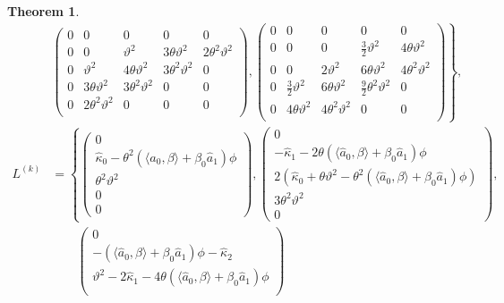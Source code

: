 \documentclass[pdftex,11pt,a4paper] {article}
\newtheorem{theorem}{Theorem}[section]
\begin{document}
\begin{theorem}
\begin{equation*}
\begin{split}
&
\left.
\begin{pmatrix} %
0 & 0 & 0 & 0 & 0 \\
0 & 0 & \vartheta^2 & 3\theta\vartheta^2 & 2\theta^2\vartheta^2 \\
0 & \vartheta^2 & 4\theta\vartheta^2 & 3\theta^2\vartheta^2 & 0 \\
0 & 3\theta\vartheta^2 & 3\theta^2\vartheta^2 & 0 & 0 \\
0 & 2\theta^2\vartheta^2 & 0 & 0 & 0\\
\end{pmatrix},
\begin{pmatrix} %
0 & 0 & 0 & 0 & 0 \\
0 & 0 & 0 & \frac{3}{2}\vartheta^2 & 4\theta\vartheta^2 \\
0 & 0 & 2\vartheta^2 & 6\theta\vartheta^2 & 4\theta^2\vartheta^2 \\
0 & \frac{3}{2}\vartheta^2 & 6\theta\vartheta^2 & \frac{9}{2}\theta^2\vartheta^2 & 0 \\
0 & 4\theta\vartheta^2 & 4\theta^2\vartheta^2 & 0 & 0\\
\end{pmatrix}\right\},\\
L^{(k)}&=\left\{\begin{pmatrix} %
0 \\ \hat\kappa_0-\theta^2(\langle \hat a_0, \beta\rangle+\beta_0 \hat a_1) \phi \\ \theta^2\vartheta^2 \\ 0 \\ 0
\end{pmatrix},
\begin{pmatrix} %
0 \\ -\hat\kappa_1-2\theta(\langle \hat a_0, \beta\rangle+\beta_0 \hat a_1) \phi \\ 2(\hat\kappa_0+\theta\vartheta^2-\theta^2(\langle \hat a_0, \beta\rangle+\beta_0 \hat a_1) \phi)\\ 3\theta^2\vartheta^2 \\ 0
\end{pmatrix},\right. \\
&\left.\qquad
\begin{pmatrix} %
0 \\  -(\langle \hat a_0, \beta\rangle+\beta_0 \hat a_1) \phi-\hat\kappa_2\\ \vartheta^2-2\hat\kappa_1-4\theta(\langle \hat a_0, \beta\rangle+\beta_0 \hat a_1) \phi \\

\end{pmatrix}
\end{split}
\end{equation*}
\end{theorem}
\end{document}
